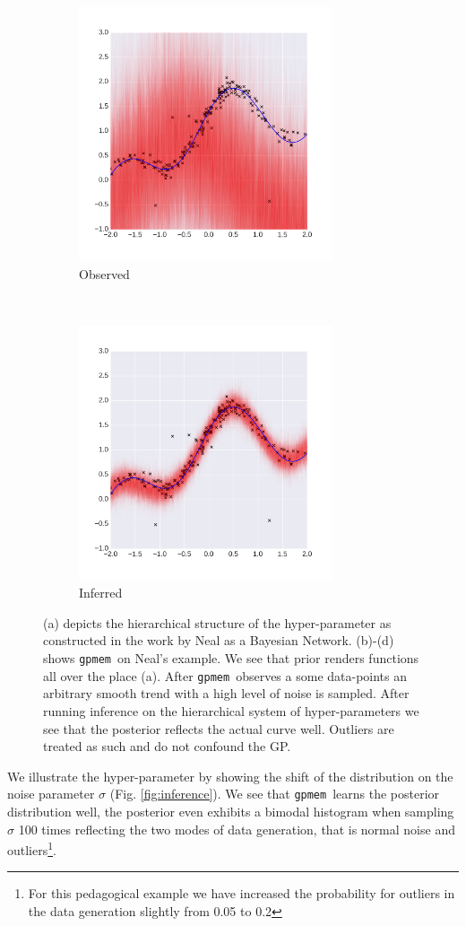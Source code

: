 \documentclass{article} %
\newcommand{\gpmem}{\texttt{gpmem}}
\begin{document}
\begin{figure}
        \begin{subfigure}[b]{0.49\textwidth} \centering
                \includegraphics[height=7.5cm]{figs/neal_se_2final.png}
                \caption{Observed}
                \label{fig:NealAO}
        \end{subfigure}
        ~ %
        \begin{subfigure}[b]{0.49\textwidth} \centering
                \includegraphics[height=7.5cm]{figs/neal_se_3final.png}
                \caption{Inferred}
                \label{fig:NealAI}
        \end{subfigure}
        \caption{(a) depicts the hierarchical structure of the hyper-parameter as constructed in the work by Neal as a Bayesian Network. (b)-(d) shows \gpmem\ on Neal's example. We see that prior renders functions all over the place (a). After \gpmem\ observes a some data-points an arbitrary smooth trend with a high level of noise is sampled. After running inference on the hierarchical system of hyper-parameters we see that the posterior reflects the actual curve well. Outliers are treated as such and do not confound the GP.}\label{fig:neal}
\end{figure}
We illustrate the hyper-parameter by showing the shift of the distribution on the noise parameter $\sigma$ (Fig. \ref{fig:inference}). We see that \gpmem\ learns the posterior distribution well, the posterior even exhibits a bimodal histogram when sampling $\sigma$ 100 times reflecting the two modes of data generation, that is normal noise and outliers\footnote{For this pedagogical example we have increased the probability for outliers in the data generation slightly from 0.05 to 0.2}. 
\end{document}

